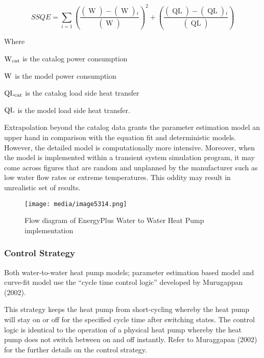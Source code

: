 \begin{equation}
SSQE = \sum\limits_{i = 1} {{{\left( {\frac{{\left( {\mathop {W{}_{cat}}\limits^{} } \right) - \left( {\mathop W\limits^{} } \right){}_i}}{{\left( {\mathop {W{}_{cat}}\limits^{} } \right)}}} \right)}^2}}  + \left( {\frac{{\left( {\mathop {QL{}_{cat}}\limits^{} } \right) - \left( {\mathop {QL}\limits^{} } \right){}_i}}{{\left( {\mathop {QL{}_{cat}}\limits^{} } \right)}}} \right)
\end{equation}

Where

\({\rm{W}}{}_{{\rm{cat}}}\) is the catalog power consumption

\({\rm{W}}{}_{}\) is the model power consumption

\({\rm{QL}}{}_{{\rm{cat}}}\) is the catalog load side heat transfer

\({\rm{QL}}{}_{}\) is the model load side heat transfer.

Extrapolation beyond the catalog data grants the parameter estimation model an upper hand in comparison with the equation fit and deterministic models. However, the detailed model is computationally more intensive. Moreover, when the model is implemented within a transient system simulation program, it may come across figures that are random and unplanned by the manufacturer such as low water flow rates or extreme temperatures. This oddity may result in unrealistic set of results.

\begin{figure}[hbtp] %
\centering
\texttt{[image: media/image5314.png]}
\caption{Flow diagram of EnergyPlus Water to Water Heat Pump implementation \protect \label{fig:flow-diagram-of-energyplus-water-to-water}}
\end{figure}

\subsubsection{Control Strategy}\label{control-strategy}

Both water-to-water heat pump models; parameter estimation based model and curve-fit model use the ``cycle time control logic'' developed by Murugappan (2002).

This strategy keeps the heat pump from short-cycling whereby the heat pump will stay on or off for the specified cycle time after switching states. The control logic is identical to the operation of a physical heat pump whereby the heat pump does not switch between on and off instantly. Refer to Muraggapan (2002) for the further details on the control strategy.

